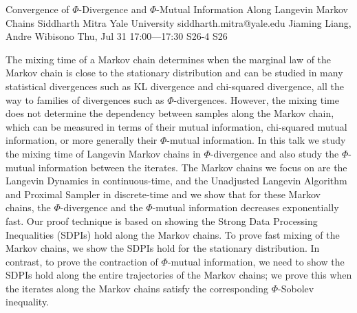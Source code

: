 \begin{talk}
  {Convergence of $\Phi$-Divergence and $\Phi$-Mutual Information Along Langevin Markov Chains}%
  {Siddharth Mitra}%
  {Yale University}%
  {siddharth.mitra@yale.edu}%
  {Jiaming Liang, Andre Wibisono}%
  {}%
  {Thu, Jul 31 17:00---17:30}%
  {S26-4}%
  {S26}%
  
    
   
The mixing time of a Markov chain determines when the marginal law of the Markov chain is close to the stationary distribution and can be studied in many statistical divergences such as KL divergence and chi-squared divergence, all the way to families of divergences such as $\Phi$-divergences. However, the mixing time does not determine the dependency between samples along the Markov chain, which can be measured in terms of their mutual information, chi-squared mutual information, or more generally their $\Phi$-mutual information. In this talk we study the mixing time of Langevin Markov chains in $\Phi$-divergence and also study the $\Phi$-mutual information between the iterates. The Markov chains we focus on are the Langevin Dynamics in continuous-time, and the Unadjusted Langevin Algorithm and Proximal Sampler in discrete-time and we show that for these Markov chains, the $\Phi$-divergence and the $\Phi$-mutual information decreases exponentially fast. Our proof technique is based on showing the Strong Data Processing Inequalities (SDPIs) hold along the Markov chains. To prove fast mixing of the Markov chains, we show the SDPIs hold for the stationary distribution. In contrast, to prove the contraction of $\Phi$-mutual information, we need to show the SDPIs hold along the entire trajectories of the Markov chains; we prove this when the iterates along the Markov chains satisfy the corresponding $\Phi$-Sobolev inequality.


\medskip


\end{talk}

